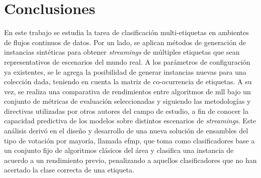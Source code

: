 \chapter{Conclusiones}

En este trabajo se estudia la tarea de clasificación multi-etiquetas en
ambientes de flujos continuos de datos. Por un lado, se aplican métodos de
generación de instancias sintéticas para obtener \textit{streamings} de
múltiples etiquetas que sean representativos de escenarios del mundo real. A los
parámetros de configuración ya existentes, se le agrega la posibilidad de
generar instancias nuevas para una colección dada, teniendo en cuenta la matriz
de co-ocurrencia de etiquetas. A su vez, se realiza una comparativa de
rendimientos entre algoritmos de \acrshort{mll} bajo un conjunto de métricas de
evaluación seleccionadas y siguiendo las metodologías y directivas utilizadas
por otros autores del campo de estudio, a fin de conocer la capacidad predictiva
de los modelos sobre distintos escenarios de \textit{streamings}. Este análisis
derivó en el diseño y desarrollo de una nueva solución de ensambles del tipo de
votación por mayoría, llamada \acrshort{efmp}, que toma como clasificadores base
a un conjunto fijo de algoritmos clásicos del área y clasifica una instancia de
acuerdo a un rendimiento previo, penalizando a aquellos clasificadores que no
han acertado la clase correcta de una etiqueta.

